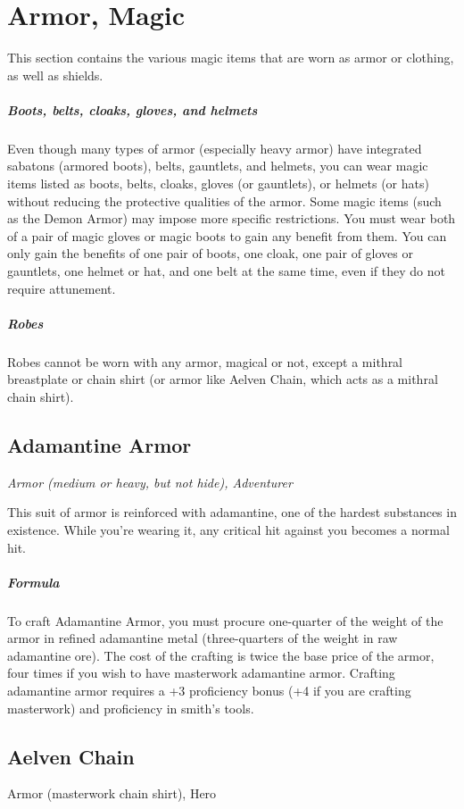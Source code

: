 \section{Armor, Magic}\label{mi:armor}

This section contains the various magic items that are worn as armor or clothing, as well as shields.

\subparagraph*{Boots, belts, cloaks, gloves, and helmets}
Even though many types of armor (especially heavy armor) have integrated sabatons (armored boots), belts, gauntlets, and helmets, you can wear magic items listed as boots, belts, cloaks, gloves (or gauntlets), or helmets (or hats) without reducing the protective qualities of the armor. Some magic items (such as the Demon Armor) may impose more specific restrictions. You must wear both of a pair of magic gloves or magic boots to gain any benefit from them. You can only gain the benefits of one pair of boots, one cloak, one pair of gloves or gauntlets, one helmet or hat, and one belt at the same time, even if they do not require attunement.

\subparagraph*{Robes}
Robes cannot be worn with any armor, magical or not, except a mithral breastplate or chain shirt (or armor like Aelven Chain, which acts as a mithral chain shirt).

\subsection{Adamantine Armor}

\textit{Armor (medium or heavy, but not hide), Adventurer}

This suit of armor is reinforced with adamantine, one of the hardest substances in existence. While you're wearing it, any critical hit against you becomes a normal hit.

\subparagraph*{Formula} To craft Adamantine Armor, you must procure one-quarter of the weight of the armor in refined adamantine metal (three-quarters of the weight in raw adamantine ore). The cost of the crafting is twice the base price of the armor, four times if you wish to have masterwork adamantine armor. Crafting adamantine armor requires a +3 proficiency bonus (+4 if you are crafting masterwork) and proficiency in smith's tools.

\subsection{Aelven Chain}
Armor (masterwork chain shirt), Hero

